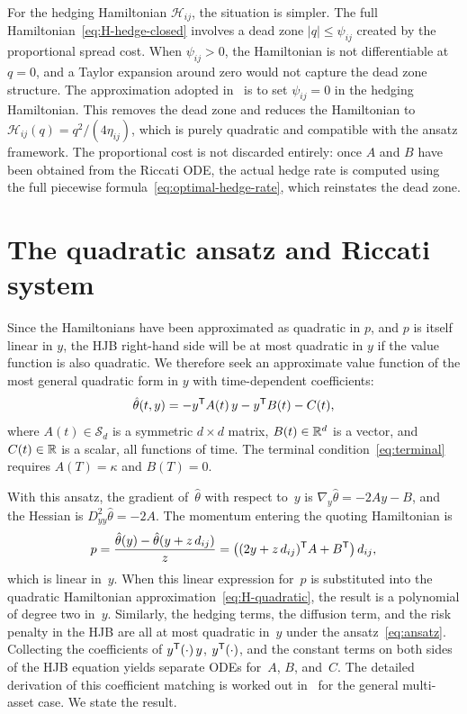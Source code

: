 For the hedging Hamiltonian $\mathcal{H}_{ij}$, the situation is simpler. The full Hamiltonian~\eqref{eq:H-hedge-closed} involves a dead zone $|q| \leq \psi_{ij}$ created by the proportional spread cost. When $\psi_{ij} > 0$, the Hamiltonian is not differentiable at~$q = 0$, and a Taylor expansion around zero would not capture the dead zone structure. The approximation adopted in~\cite{barzykin2023} is to set $\psi_{ij} = 0$ in the hedging Hamiltonian. This removes the dead zone and reduces the Hamiltonian to $\mathcal{H}_{ij}(q) = q^2/(4\eta_{ij})$, which is purely quadratic and compatible with the ansatz framework. The proportional cost is not discarded entirely: once $A$ and $B$ have been obtained from the Riccati ODE, the actual hedge rate is computed using the full piecewise formula~\eqref{eq:optimal-hedge-rate}, which reinstates the dead zone.


\section{The quadratic ansatz and Riccati system}
\label{sec:ode-ansatz}

Since the Hamiltonians have been approximated as quadratic in $p$, and $p$ is itself linear in $y$, the HJB right-hand side will be at most quadratic in $y$ if the value function is also quadratic. We therefore seek an approximate value function of the most general quadratic form in $y$ with time-dependent coefficients:
\begin{equation}
  \label{eq:ansatz}
  \hat\theta(t, y) = -y^{\mathsf{T}} A(t)\,y - y^{\mathsf{T}} B(t) - C(t),
\end{equation}
where $A(t) \in \mathcal{S}_d$ is a symmetric $d \times d$ matrix, $B(t) \in \mathbb{R}^d$ is a vector, and $C(t) \in \mathbb{R}$ is a scalar, all functions of time. The terminal condition~\eqref{eq:terminal} requires $A(T) = \kappa$ and $B(T) = 0$.

With this ansatz, the gradient of~$\hat\theta$ with respect to~$y$ is $\nabla_y\hat\theta = -2Ay - B$, and the Hessian is $D^2_{yy}\hat\theta = -2A$. The momentum entering the quoting Hamiltonian is
\begin{equation}
  \label{eq:p-ansatz}
  p = \frac{\hat\theta(y) - \hat\theta(y + z\,d_{ij})}{z} = \bigl((2y + z\,d_{ij})^{\mathsf{T}} A + B^{\mathsf{T}}\bigr)\,d_{ij},
\end{equation}
which is linear in~$y$. When this linear expression for~$p$ is substituted into the quadratic Hamiltonian approximation~\eqref{eq:H-quadratic}, the result is a polynomial of degree two in~$y$. Similarly, the hedging terms, the diffusion term, and the risk penalty in the HJB are all at most quadratic in~$y$ under the ansatz~\eqref{eq:ansatz}. Collecting the coefficients of $y^{\mathsf{T}}(\cdot)\,y$, $y^{\mathsf{T}}(\cdot)$, and the constant terms on both sides of the HJB equation yields separate ODEs for~$A$, $B$, and~$C$. The detailed derivation of this coefficient matching is worked out in~\cite{bergault2021} for the general multi-asset case. We state the result.

